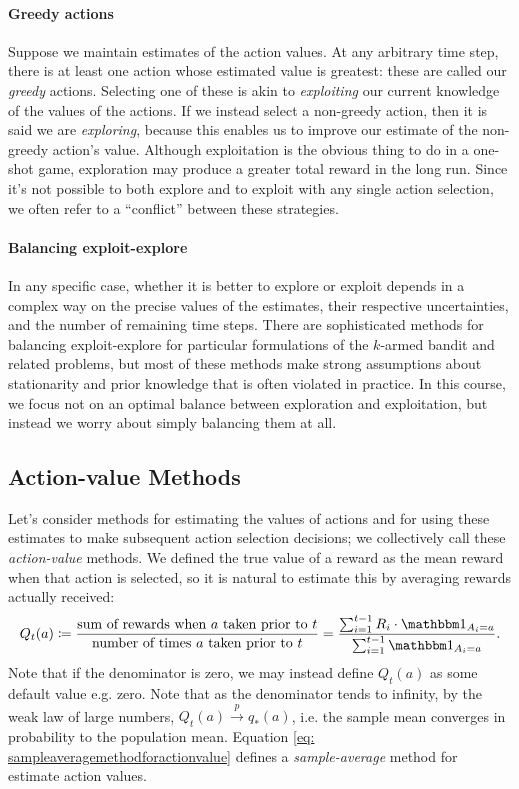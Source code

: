 \documentclass[12pt]{article}
\begin{document}
\paragraph{Greedy actions} Suppose we maintain estimates of the action values. At any arbitrary time step, there is at least one action whose estimated value is greatest: these are called our \emph{greedy} actions. Selecting one of these is akin to \emph{exploiting} our current knowledge of the values of the actions. If we instead select a non-greedy action, then it is said we are \emph{exploring}, because this enables us to improve our estimate of the non-greedy action's value. Although exploitation is the obvious thing to do in a one-shot game, exploration may produce a greater total reward in the long run. Since it's not possible to both explore and to exploit with any single action selection, we often refer to a ``conflict'' between these strategies.

\paragraph{Balancing exploit-explore} In any specific case, whether it is better to explore or exploit depends in a complex way on the precise values of the estimates, their respective uncertainties, and the number of remaining time steps. There are sophisticated methods for balancing exploit-explore for particular formulations of the $k$-armed bandit and related problems, but most of these methods make strong assumptions about stationarity and prior knowledge that is often violated in practice. In this course, we focus not on an optimal balance between exploration and exploitation, but instead we worry about simply balancing them at all.

\subsection{Action-value Methods}
Let's consider methods for estimating the values of actions and for using these estimates to make subsequent action selection decisions; we collectively call these \emph{action-value} methods. We defined the true value of a reward as the mean reward when that action is selected, so it is natural to estimate this by averaging rewards actually received:
\begin{equation}
  \label{eq: sampleaveragemethodforactionvalue}
  Q_t(a) \coloneqq \frac{\textrm{sum of rewards when } a \textrm{ taken prior to } t}{\textrm{number of times } a \textrm{ taken prior to } t} = \frac{\sum_{i=1}^{t-1} R_i \cdot \mathbbm 1_{A_i = a}}{\sum_{i=1}^{t-1} \mathbbm 1_{A_i = a}}.
\end{equation}
Note that if the denominator is zero, we may instead define $Q_t(a)$ as some default value e.g. zero. Note that as the denominator tends to infinity, by the weak law of large numbers, $Q_t(a) \overset{p}{\longrightarrow} q_*(a)$, i.e. the sample mean converges in probability to the population mean. Equation
\ref{eq: sampleaveragemethodforactionvalue} defines a \emph{sample-average} method for estimate action values.
\end{document}
